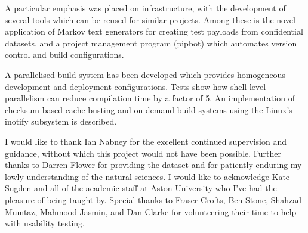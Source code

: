A particular emphasis was placed on infrastructure, with the
development of several tools which can be reused for similar
projects. Among these is the novel application of Markov text
generators for creating test payloads from confidential datasets, and
a project management program (pipbot) which automates version control
and build configurations.

A parallelised build system has been developed which provides
homogeneous development and deployment configurations. Tests show how
shell-level parallelism can reduce compilation time by a factor of
5. An implementation of checksum based cache busting and on-demand
build systems using the Linux's inotify subsystem is described.




I would like to thank Ian Nabney for the excellent continued
supervision and guidance, without which this project would not have
been possible. Further thanks to Darren Flower for providing the
dataset and for patiently enduring my lowly understanding of the
natural sciences. I would like to acknowledge Kate Sugden and all of
the academic staff at Aston University who I've had the pleasure of
being taught by. Special thanks to Fraser Crofts, Ben Stone, Shahzad
Mumtaz, Mahmood Jasmin, and Dan Clarke for volunteering their time to
help with usability testing.
